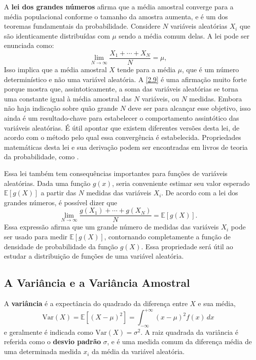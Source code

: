 A \textbf{lei dos grandes números} afirma que a média amostral converge para a média populacional conforme o tamanho da amostra aumenta, e é um dos teoremas fundamentais da probabilidade. Considere $N$ variáveis aleatórias $X_i$ que são identicamente distribuídas com $\mu$ sendo a média comum delas. A lei pode ser enunciada como:
\begin{equation}\label{2.9}
\lim\limits_{N \to \infty} \dfrac{X_1 + \cdots + X_N}{N} = \mu,
\end{equation}
Isso implica que a média amostral $X$ tende para a média $\mu$, que é um número determinístico e não uma variável aleatória. A \autoref{2.9} é uma afirmação muito forte porque mostra que, assintoticamente, a soma das variáveis aleatórias se torna uma constante igual à média amostral das $N$ variáveis, ou $N$ medidas. Embora não haja indicação sobre quão grande $N$ deve ser para alcançar esse objetivo, isso ainda é um resultado-chave para estabelecer o comportamento assintótico das variáveis aleatórias. É útil apontar que existem diferentes versões desta lei, de acordo com o método pelo qual essa convergência é estabelecida. Propriedades matemáticas desta lei e sua derivação podem ser encontradas em livros de teoria da probabilidade, como \citet{kolmogorov1950foundations,ross2019introduction}.

Essa lei também tem consequências importantes para funções de variáveis aleatórias. Dada uma função $g(x)$, seria conveniente estimar seu valor esperado $\mathbb{E}[g(X)]$ a partir das $N$ medidas das variáveis $X_i$. De acordo com a lei dos grandes números, é possível dizer que
\begin{equation}
	\lim\limits_{N \to \infty} \dfrac{g(X_1) + \cdots + g(X_N)}{N} = \mathbb{E}[g(X)].
\end{equation}
Essa expressão afirma que um grande número de medidas das variáveis $X_i$ pode ser usado para medir $\mathbb{E}[g(X)]$, contornando completamente a função de densidade de probabilidade da função $g(X)$. Essa propriedade será útil ao estudar a distribuição de funções de uma variável aleatória.

\subsection{A Variância e a Variância Amostral}

A \textbf{variância} é a expectância do quadrado da diferença entre $X$ e sua média,
\begin{equation}\label{2.11}
\text{Var}(X) = \mathbb{E}[(X - \mu)^2] = \int_{-\infty}^{+\infty} (x - \mu)^2 f(x)\,dx
\end{equation}
e geralmente é indicada como $\text{Var}(X) = \sigma^2$. A raiz quadrada da variância é referida como o \textbf{desvio padrão} $\sigma$, e é uma medida comum da diferença média de uma determinada medida $x_i$ da média da variável aleatória.

